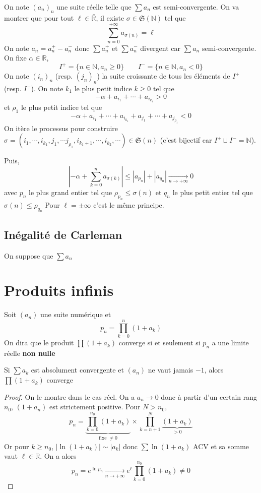 
On note $(a_n)_n$ une suite réelle telle que $\sum a_n$ est semi-convergente. On va montrer que pour tout $\ell\in\bar{\mathbb R}$, il existe $\sigma\in\mathfrak S(\mathbb N)$ tel que \[
    \sum_{n=0}^{+\infty}a_{\sigma(n)}=\ell
\]
On note $a_n=a_n^+-a_n^-$ donc $\sum a_n^+$ et $\sum a_n^-$ divergent car $\sum a_n$ semi-convergente. On fixe $\alpha\in\mathbb R$, \[I^+=\{n\in\mathbb N, a_n\geq 0\}\qquad I^-=\{n\in\mathbb N, a_n<0\}\]
On note $(i_n)_n$ (resp. $(j_n)_n$) la suite croissante de tous les éléments de $I^+$ (resp. $I^-$).
On note $k_1$ le plus petit indice $k\geq 0$ tel que \[
    -\alpha+a_{i_1}+\cdots +a_{i_{k_1}}>0
\]
et $\rho_1$ le plus petit indice tel que \[
    -\alpha+a_{i_1}+\cdots +a_{i_{k_1}}+a_{j_1}+\cdots +a_{j_{\rho_1}}<0
\]
On itère le processus pour construire $\sigma=(i_1, \cdots, i_{k_1}, j_1, \cdots j_{\rho_1}, i_{k_1+1}, \cdots, i_{k_2}, \cdots)\in\mathfrak S(n)$ (c'est bijectif car $I^+\sqcup I^-=\mathbb N$).

Puis, \[
    \left| -\alpha+\sum_{k=0}^na_{\sigma(k)} \right|\leq |a_{p_n}|+|a_{q_n}|\xrightarrow[n\to+\infty]{}0
\]
avec $p_n$ le plus grand entier tel que $\rho_{p_n}\leq \sigma(n)$ et $q_n$ le plus petit entier tel que $\sigma(n)\leq \rho_{q_n}$
Pour $\ell=\pm\infty$ c'est le même principe.

\subsection{Inégalité de Carleman}


On suppose que $\sum a_n$

\section{Produits infinis}

Soit $(a_n)$ une suite numérique et \[
    p_n=\prod_{k=0}^n(1+a_k)
\]
On dira que le produit $\prod(1+a_k)$ converge si et seulement si $p_n$ a une limite réelle \textbf{non nulle}

\begin{res}
    Si $\sum a_k$ est absolument convergente et $(a_n)$ ne vaut jamais $-1$, alors $\prod(1+a_k)$ converge
\end{res}

\begin{proof}
    On le montre dans le cas réel. On a $a_n\longrightarrow 0$ donc à partir d'un certain rang $n_0$, $(1+a_n)$ est strictement positive. Pour $N>n_0$, \[
        p_n=\underbrace{\prod_{k=0}^{n_0}(1+a_k)}_{\text{fixe } \neq 0}\times \prod_{k=n+1}^{N}\underbrace{(1+a_k)}_{>0}
    \]
    Or pour $k\geq n_0$, $|\ln(1+a_k)|\sim |a_k|$ donc $\sum \ln(1+a_k)$ ACV et sa somme vaut $\ell\in\mathbb R$. On a alors \[
        p_n=e^{\ln p_n}\xrightarrow[n\to+\infty]{}e^\ell \prod_{k=0}^{n_0}(1+a_k) \neq 0
    \]
\end{proof}

